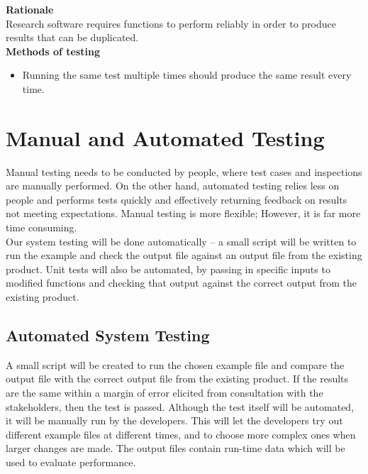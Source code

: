 \documentclass[12pt]{article}
\begin{document}
\textbf{Rationale}\\
Research software requires functions to perform reliably in order to produce results that can be duplicated.\\

\textbf{Methods of testing}
\begin{itemize}
\item Running the same test multiple times should produce the same result every time.
\end{itemize} 
\section{Manual and Automated Testing}
Manual testing needs to be conducted by people, where test cases and inspections are manually performed. On the other hand, automated testing relies less on people and performs tests quickly and effectively returning feedback on results not meeting expectations. Manual testing is more flexible; However, it is far more time consuming.\\

Our system testing will be done automatically -- a small script will be written to run the example and check the output file against an output file from the existing product. Unit tests will also be automated, by passing in specific inputs to modified functions and checking that output against the correct output from the existing product.

\subsection{Automated System Testing}
A small script will be created to run the chosen example file and compare the output file with the correct output file from the existing product. If the results are the same within a margin of error elicited from consultation with the stakeholders, then the test is passed. Although the test itself will be automated, it will be manually run by the developers. This will let the developers try out different example files at different times, and to choose more complex ones when larger changes are made. The output files contain run-time data which will be used to evaluate performance.
\end{document}
